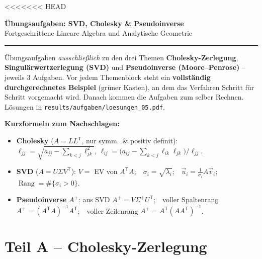 \documentclass[a4paper,11pt]{article}
\newcommand{\transp}{^{\mathsf{T}}}
\newcommand{\inv}{^{-1}}
\newcommand{\pinv}{^{+}}
\newcommand{\transp}{^{\mathsf{T}}}
\begin{document}
\color{fg}
<<<<<<< HEAD

\thispagestyle{fancy}

\begin{center}
  {\color{accent}\LARGE\bfseries Übungsaufgaben: SVD, Cholesky \& Pseudoinverse}\\[0.4em]
  {\large Fortgeschrittene Lineare Algebra und Analytische Geometrie}\\[0.3em]
  {\color{gridcolor}\rule{\linewidth}{0.4pt}}
\end{center}

\vspace{0.4em}

Übungsaufgaben \emph{ausschließlich} zu den drei Themen \textbf{Cholesky-Zerlegung},
\textbf{Singulärwertzerlegung (SVD)} und \textbf{Pseudoinverse (Moore--Penrose)} -- jeweils
$3$ Aufgaben. Vor jedem Themenblock steht ein \textbf{vollständig durchgerechnetes Beispiel}
(grüner Kasten), an dem das Verfahren Schritt für Schritt vorgemacht wird. Danach kommen die
Aufgaben zum selber Rechnen. Lösungen in \texttt{results/aufgaben/loesungen\_05.pdf}.

\medskip
\textbf{Kurzformeln zum Nachschlagen:}
\begin{itemize}[leftmargin=1.4em, itemsep=2pt]
  \item \textbf{Cholesky} ($A=LL\transp$, nur symm.\ \& positiv definit):
        $\ell_{jj}=\sqrt{a_{jj}-\sum_{k<j}\ell_{jk}^2}$,\quad
        $\ell_{ij}=\big(a_{ij}-\sum_{k<j}\ell_{ik}\ell_{jk}\big)/\ell_{jj}$.
  \item \textbf{SVD} ($A=U\Sigma V\transp$): $V=$ EV von $A\transp A$;\ \ $\sigma_i=\sqrt{\lambda_i}$;\ \
        $\vec u_i=\tfrac{1}{\sigma_i}A\vec v_i$;\ \ $\operatorname{Rang}=\#\{\sigma_i>0\}$.
  \item \textbf{Pseudoinverse} $A\pinv$: aus SVD $A\pinv=V\Sigma\pinv U\transp$;\ \ voller Spaltenrang
        $A\pinv=(A\transp A)\inv A\transp$;\ \ voller Zeilenrang $A\pinv=A\transp(AA\transp)\inv$.
\end{itemize}

\clearpage
\section*{Teil A \;--\; Cholesky-Zerlegung}
\end{document}

